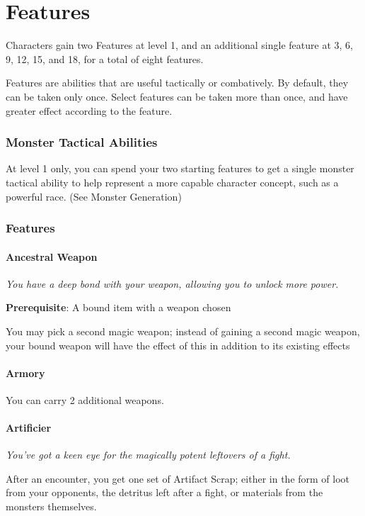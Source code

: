 \chapter{Features}
\begin{multicols*}{2}
Characters gain two Features at level 1, and an additional single feature at 3, 6, 9, 12, 15, and 18, for a total of eight features.

Features are abilities that are useful tactically or combatively. By default, they can be taken only once. Select features can be taken more than once, and have greater effect according to the feature.

\subsection*{Monster Tactical Abilities}
At level 1 only, you can spend your two starting features to get a single monster tactical ability to help represent a more capable character concept, such as a powerful race. (See Monster Generation)

\subsection*{Features}
\subsubsection{Ancestral Weapon}
\emph{You have a deep bond with your weapon, allowing you to unlock more power.}

\textbf{Prerequisite}: A bound item with a weapon chosen

You may pick a second magic weapon; instead of gaining a second magic weapon, your bound weapon will have the effect of this in addition to its existing effects

\subsubsection{Armory}
You can carry 2 additional weapons.

\subsubsection{Artificier}
\emph{You’ve got a keen eye for the magically potent leftovers of a fight.}

After an encounter, you get one set of Artifact Scrap; either in the form of loot from your opponents, the detritus left after a fight, or materials from the monsters themselves.


\end{multicols*}
